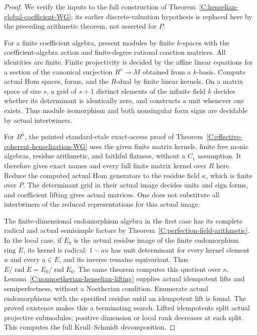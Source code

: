 \begin{proof}
We verify the inputs to the full construction of
Theorem~\ref{C:henselian-global-coefficient-WG}; its earlier
discrete-valuation hypothesis is replaced here by the preceding
arithmetic theorem, not asserted for $P$.

For a finite coefficient algebra, present modules by finite
$k$-spaces with the coefficient-algebra action and finite-degree
rational coaction matrices.  All identities are finite.  Finite
projectivity is decided by the affine linear equations for a
section of the canonical surjection $R^s\to M$ obtained from a
$k$-basis.  Compute actual Hom spaces, forms, and the $R$-dual by
finite linear kernels.  On a matrix space of size $s$, a grid of
$s+1$ distinct elements of the infinite field $k$ decides whether
its determinant is identically zero, and constructs a unit whenever
one exists.  Thus module isomorphism and both nonsingular form
signs are decidable by actual intertwiners.

For $B^h$, the pointed standard-etale exact-access proof of
Theorem~\ref{C:effective-coherent-henselization-WG} uses the given
finite matrix kernels, finite free monic algebras, residue arithmetic,
and faithful flatness, without a $C_1$ assumption.  It therefore
gives exact names and every full finite matrix kernel over $R$ here.
Reduce the computed actual Hom generators to the residue field
$\kappa$, which is finite over $P$.  The determinant grid in their
actual image decides units and sign forms, and coefficient lifting
gives actual matrices.  One does not substitute all intertwiners
of the reduced representations for this actual image.

The finite-dimensional endomorphism algebra in the first case has
its complete radical and actual semisimple factors by
Theorem~\ref{C:perfection-field-arithmetic}.  In the local case, if
$E_0$ is the actual residue image of the finite endomorphism ring
$E$, its kernel is radical: $1-au$ has unit determinant for every
kernel element $u$ and every $a\in E$, and its inverse remains
equivariant.  Thus $E/\operatorname{rad}E=E_0/\operatorname{rad}E_0$.
The same theorem computes this quotient over $\kappa$.
Lemma~\ref{C:nonnoetherian-henselian-lifting} supplies actual
idempotent lifts and semiperfectness, without a Noetherian condition.
Enumerate actual endomorphisms with the specified residue until an
idempotent lift is found.  The proved existence makes this a
terminating search.  Lifted idempotents split actual projective
submodules; positive dimension or local rank decreases at each split.
This computes the full Krull--Schmidt decomposition.


\end{proof}
